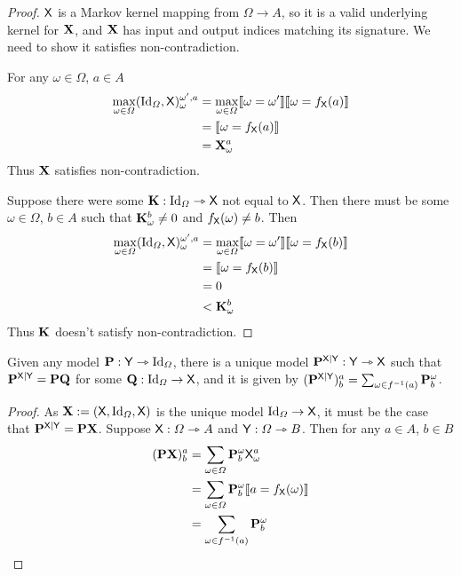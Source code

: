 \begin{proof}
$\mathsf{X}$ is a Markov kernel mapping from $\Omega\to A$, so it is a valid underlying kernel for $\mathbf{X}$, and $\mathbf{X}$ has input and output indices matching its signature. We need to show it satisfies non-contradiction.

For any $\omega\in \Omega$, $a\in A$
\begin{align}
	\max_{\omega\in \Omega}(\text{Id}_\Omega,\mathsf{X})_{\omega}^{\omega',a} &= \max_{\omega\in \Omega} \llbracket \omega = \omega' \rrbracket \llbracket \omega = f_{\mathsf{X}}(a) \rrbracket\\
	&= \llbracket \omega = f_{\mathsf{X}}(a) \rrbracket\\
	&= \mathbf{X}_\omega^a
\end{align}
Thus $\mathbf{X}$ satisfies non-contradiction.

Suppose there were some $\mathbf{K}:\text{Id}_\Omega\rightarrowtriangle \mathsf{X}$ not equal to $\mathsf{X}$. Then there must be some $\omega\in \Omega$, $b\in A$ such that $\mathbf{K}_\omega^b\neq 0$ and $f_{\mathsf{X}}(\omega)\neq b$. Then
\begin{align}
	\max_{\omega\in \Omega}(\text{Id}_\Omega,\mathsf{X})_{\omega}^{\omega',a} &= \max_{\omega\in \Omega} \llbracket \omega = \omega' \rrbracket \llbracket \omega = f_{\mathsf{X}}(b) \rrbracket\\
	&= \llbracket \omega = f_{\mathsf{X}}(b) \rrbracket\\
	&= 0\\
	&< \mathbf{K}_\omega^b
\end{align}
Thus $\mathbf{K}$ doesn't satisfy non-contradiction.
\end{proof}

\begin{lemma}\label{lem:pushforward}
Given any model $\mathbf{P}:\mathsf{Y}\rightarrowtriangle \text{Id}_\Omega$, there is a unique model $\mathbf{P}^{\mathsf{X}|\mathsf{Y}}:\mathsf{Y}\rightarrowtriangle \mathsf{X}$ such that $\mathbf{P}^{\mathsf{X}|\mathsf{Y}}=\mathbf{P}\mathbf{Q}$ for some $\mathbf{Q}:\text{Id}_\Omega\to \mathsf{X}$, and it is given by $(\mathbf{P}^{\mathsf{X}|\mathsf{Y}})^a_b = \sum_{\omega\in f^{-1}(a)} \mathbf{P}_b^{\omega}$.
\end{lemma}

\begin{proof}
As $\mathbf{X}:=(\mathsf{X},\text{Id}_\Omega,\mathsf{X})$ is the unique model $\text{Id}_\Omega\to \mathsf{X}$, it must be the case that $\mathbf{P}^{\mathsf{X}|\mathsf{Y}}=\mathbf{P}\mathbf{X}$. Suppose $\mathsf{X}:\Omega\rightarrowtriangle A$ and $\mathsf{Y}:\Omega\rightarrowtriangle B$. Then for any $a\in A$, $b\in B$
\begin{align}
	(\mathbf{P}\mathbf{X})^a_b &= \sum_{\omega\in \Omega} \mathbf{P}_b^\omega\mathsf{X}_\omega^a\\
						 &= \sum_{\omega\in \Omega} \mathbf{P}_b^\omega \llbracket a = f_{\mathsf{X}}(\omega) \rrbracket\\
						 &= \sum_{\omega\in f^{-1}(a)} \mathbf{P}_b^{\omega}
\end{align}
\end{proof}


